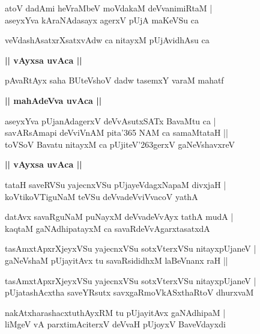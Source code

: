 \documentclass[twoside,12pt,openright]{book}
\def\S{\char'263}
\newcounter{shloka}[chapter]
\def\uvaca#1{\centerline{{\large\textbf{#1}}}}
\begin{document}
\begin{shloka}%
atoV dadAmi heVraMbeV moVdakaM deVvanimiRtaM |\\
aseyxYva kAraNAdasayx agerxV pUjA maKeVSu ca 
\end{shloka}

\begin{shloka}%
veVdashAsatxrXsatxvAdw ca nitayxM pUjAvidhAsu ca 
\end{shloka}

\uvaca{|| vAyxsa uvAca ||}

\begin{shloka}%
pAvaRtAyx saha BUteVshoV dadw tasemxY varaM mahatf
\end{shloka}

\uvaca{|| mahAdeVva uvAca ||}

\begin{shloka}%
aseyxYva pUjanAdagerxV deVvAsutxSATx BavaMtu ca |\\
savARsAmapi deVviVnAM pita\char'365 NAM ca samaMtataH ||\\
toVSoV Bavatu nitayxM ca pUjiteV\S gerxV gaNeVshavxreV 
\end{shloka}

\uvaca{|| vAyxsa uvAca ||}

\begin{shloka}%
tataH saveRVSu yajecnxVSu pUjayeVdagxNapaM divxjaH |\\
koVtikoVTiguNaM teVSu deVvadeVviVvacoV yathA 
\end{shloka}

\begin{shloka}%
datAvx savaRguNaM puNayxM deVvadeVvAyx tathA mudA |\\
kaqtaM gaNAdhipatayxM ca savaRdeVvAgarxtasatxdA 
\end{shloka}

\begin{shloka}%
tasAmxtApxrXjeyxVSu yajecnxVSu sotxVterxVSu nitayxpUjaneV |\\
gaNeVshaM pUjayitAvx tu savaRsididhxM laBeVnanx raH ||
\end{shloka}

\begin{shloka}%
tasAmxtApxrXjeyxVSu yajecnxVSu sotxVterxVSu nitayxpUjaneV |\\
pUjatashAcxtha saveYRsutx savxgaRmoVkASxthaRtoV dhurxvaM 
\end{shloka}

\begin{shloka}%
nakAtxharashacxtuthAyxRM tu pUjayitAvx gaNAdhipaM |\\
liMgeV vA parxtimAciterxV deVvaH pUjoyxV BaveVdayxdi
\end{shloka}
\end{document}

